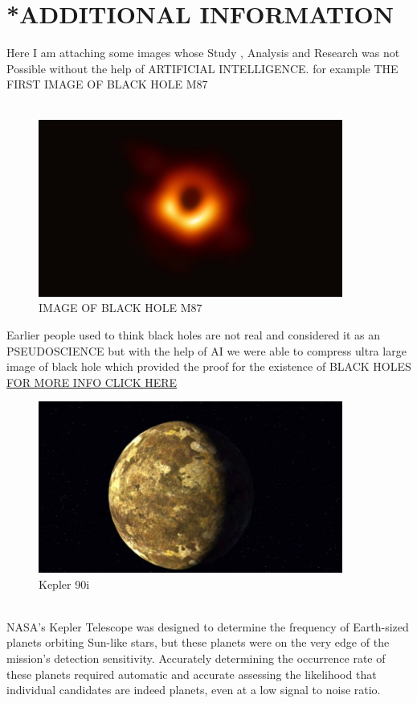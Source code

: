 \documentclass[a4paper]{article}
\begin{document}
\section{\textbf{*ADDITIONAL INFORMATION}}
Here I am attaching some images whose Study , Analysis and Research was not Possible without the help of ARTIFICIAL INTELLIGENCE.
for example THE FIRST IMAGE OF BLACK HOLE M87\\
\\
\begin{figure}[htp]
    \centering
    \includegraphics[width=10cm]{45456original.jpg}
    \caption{IMAGE OF BLACK HOLE M87}
    \label{fig:FIGURE 1}
\end{figure}
Earlier people used to think black holes are not real and considered it as an PSEUDOSCIENCE but with the help of AI we were able to compress ultra large image of black hole which provided the proof for the existence of  BLACK HOLES
\href{ https://numpy.org/case-studies/blackhole-image/}{FOR MORE INFO CLICK HERE}
\begin{figure}[htp]
    \centering
    \includegraphics[width=10cm]{957149261348-16x9-xlarge.jpg}
    \caption{Kepler 90i}
    \label{fig:FIGURE 2}
\end{figure}
\\NASA’s Kepler Telescope was designed to determine the frequency of Earth-sized planets orbiting Sun-like stars, but these planets were on the very edge of the mission’s detection sensitivity. Accurately determining the occurrence rate of these planets required automatic and accurate assessing the likelihood that individual candidates are indeed planets, even at a low signal to noise ratio.
\end{document}
